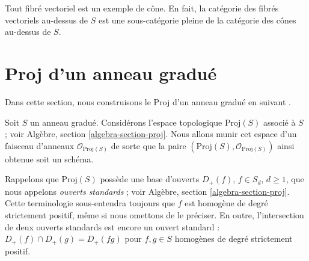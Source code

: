 \noindent
Tout fibré vectoriel est un exemple de cône. En fait, la catégorie des
fibrés vectoriels au-dessus de $S$ est une sous-catégorie pleine de la
catégorie des cônes au-dessus de $S$.










\section{Proj d'un anneau gradué}
\label{section-proj}

\noindent
Dans cette section, nous construisons le Proj d'un anneau gradué
en suivant \cite[II, section 2]{EGA}.

\medskip\noindent
Soit $S$ un anneau gradué. Considérons l'espace topologique $\text{Proj}(S)$
associé à $S$ ; voir Algèbre, section \ref{algebra-section-proj}.
Nous allons munir cet espace d'un faisceau d'anneaux $\mathcal{O}_{\text{Proj}(S)}$
de sorte que la paire $(\text{Proj}(S), \mathcal{O}_{\text{Proj}(S)})$
ainsi obtenue soit un schéma.

\medskip\noindent
Rappelons que $\text{Proj}(S)$ possède une base d'ouverts $D_{+}(f)$,
$f \in S_d$, $d \geq 1$, que nous appelons {\it ouverts standards} ; voir
Algèbre, section \ref{algebra-section-proj}. Cette terminologie sous-entendra
toujours que $f$ est homogène de degré strictement positif, même si nous
omettons de le préciser. En outre, l'intersection de deux ouverts standards
est encore un ouvert standard :
$D_{+}(f) \cap D_{+}(g) = D_{+}(fg)$ pour $f, g \in S$ homogènes de degré strictement positif.

